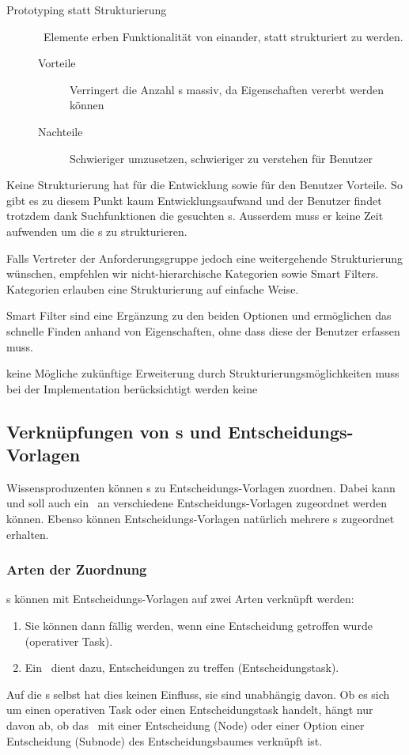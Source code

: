 {{\begin{description}
					\item[Prototyping statt Strukturierung] \
						Elemente erben Funktionalität von einander, statt strukturiert zu werden.
						\begin{description}
							\item[Vorteile] Verringert die Anzahl \ttpl s massiv, 
								da Eigenschaften vererbt werden können
							\item[Nachteile] Schwieriger umzusetzen, schwieriger zu verstehen für Benutzer
						\end{description}					
				\end{description}
			}
			{
				Keine Strukturierung hat für die Entwicklung sowie für den Benutzer Vorteile.
				So gibt es zu diesem Punkt kaum Entwicklungsaufwand 
				und der Benutzer findet trotzdem dank Suchfunktionen die gesuchten \ttpl s.
				Ausserdem muss er keine Zeit aufwenden um die \ttpl s zu strukturieren.

				Falls Vertreter der Anforderungsgruppe jedoch eine weitergehende Strukturierung wünschen, 
				empfehlen wir nicht-hierarchische Kategorien sowie Smart Filters.
				Kategorien erlauben eine Strukturierung auf einfache Weise. 

				Smart Filter sind eine Ergänzung zu den beiden Optionen und ermöglichen das schnelle Finden anhand von Eigenschaften,
				ohne dass diese der Benutzer erfassen muss.
			}
			{keine}
			{Mögliche zukünftige Erweiterung durch Strukturierungsmöglichkeiten muss bei der Implementation berücksichtigt werden}
			{keine}
		}
		
		
		\subsection{Verknüpfungen von \ttpl s und Entscheidungs-Vorlagen}
			Wissensproduzenten können \ttpl s zu Entscheidungs-Vorlagen zuordnen.
			Dabei kann und soll auch ein \ttpl\ an verschiedene Entscheidungs-Vorlagen zugeordnet werden können.
			Ebenso können Entscheidungs-Vorlagen natürlich mehrere \ttpl s zugeordnet erhalten.
			
			\subsubsection{Arten der Zuordnung}
				\ttpl s können mit Entscheidungs-Vorlagen auf zwei Arten verknüpft werden:
				\begin{enumerate}
					\item Sie können dann fällig werden, wenn eine Entscheidung getroffen wurde (operativer Task).
					\item Ein \ttpl\ dient dazu, Entscheidungen zu treffen (Entscheidungstask).
				\end{enumerate}
				Auf die \ttpl s selbst hat dies keinen Einfluss, sie sind unabhängig davon. 
				Ob es sich um einen operativen Task oder einen Entscheidungstask handelt, hängt nur davon ab,
				ob das \ttpl\ mit einer Entscheidung (Node) oder einer Option einer Entscheidung (Subnode) des Entscheidungsbaumes verknüpft ist.
				
